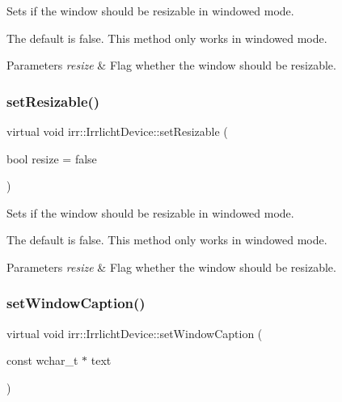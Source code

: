 Sets if the window should be resizable in windowed mode. 

The default is false. This method only works in windowed mode. 
\begin{DoxyParams}{Parameters}
{\em resize} & Flag whether the window should be resizable. \\
\hline
\end{DoxyParams}
\mbox{\label{classirr_1_1IrrlichtDevice_a4911502bd085d2d87474ff12959bc341}} 
\subsubsection{\texorpdfstring{set\+Resizable()}{setResizable()}\hspace{0.1cm}{\footnotesize\ttfamily [3/3]}}
{\footnotesize\ttfamily virtual void irr\+::\+Irrlicht\+Device\+::set\+Resizable (\begin{DoxyParamCaption}\item[{bool}]{resize = {\ttfamily false} }\end{DoxyParamCaption})\hspace{0.3cm}{\ttfamily [pure virtual]}}



Sets if the window should be resizable in windowed mode. 

The default is false. This method only works in windowed mode. 
\begin{DoxyParams}{Parameters}
{\em resize} & Flag whether the window should be resizable. \\
\hline
\end{DoxyParams}
\mbox{\label{classirr_1_1IrrlichtDevice_a3d7c98d520bf18ce1973c6f1439a7c0f}} 
\subsubsection{\texorpdfstring{set\+Window\+Caption()}{setWindowCaption()}\hspace{0.1cm}{\footnotesize\ttfamily [1/3]}}
{\footnotesize\ttfamily virtual void irr\+::\+Irrlicht\+Device\+::set\+Window\+Caption (\begin{DoxyParamCaption}\item[{const wchar\+\_\+t $\ast$}]{text }\end{DoxyParamCaption})\hspace{0.3cm}{\ttfamily [pure virtual]}}



